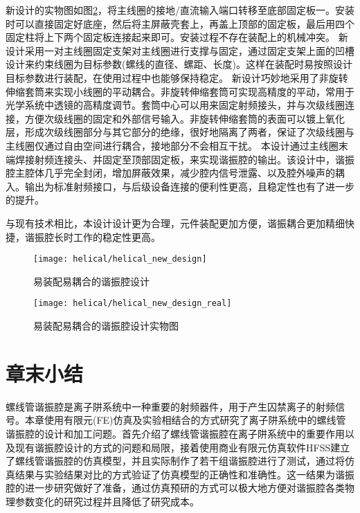 新设计的实物图如图\ref{fig:helical_new_design_real}，将主线圈的接地/直流输入端口转移至底部固定板一。安装时可以直接固定好底座，然后将主屏蔽壳套上，再盖上顶部的固定板，最后用四个固定柱将上下两个固定板连接起来即可。安装过程不存在装配上的机械冲突。
新设计采用一对主线圈固定支架对主线圈进行支撑与固定，通过固定支架上面的凹槽设计来约束线圈为目标参数(螺线的直径、螺距、长度)。这样在装配时易按照设计目标参数进行装配，在使用过程中也能够保持稳定。
新设计巧妙地采用了非旋转伸缩套筒来实现小线圈的平动耦合。非旋转伸缩套筒可实现高精度的平动，常用于光学系统中透镜的高精度调节。套筒中心可以用来固定射频接头，并与次级线圈连接，方便次级线圈的固定和外部信号输入。非旋转伸缩套筒的表面可以镀上氧化层，形成次级线圈部分与其它部分的绝缘，很好地隔离了两者，保证了次级线圈与主线圈仅通过自由空间进行耦合，接地部分不会相互干扰。
本设计通过主线圈末端焊接射频连接头、并固定至顶部固定板，来实现谐振腔的输出。该设计中，谐振腔主腔体几乎完全封闭，增加屏蔽效果，减少腔内信号泄露、以及腔外噪声的耦入。输出为标准射频接口，与后级设备连接的便利性更高，且稳定性也有了进一步的提升。

与现有技术相比，本设计设计更为合理，元件装配更加方便，谐振耦合更加精细快捷，谐振腔长时工作的稳定性更高。
\begin{figure}
    \centering
    \texttt{[image: helical/helical\_new\_design]}
    \caption[易装配易耦合的谐振腔设计]{易装配易耦合的谐振腔设计\label{fig:helical_new_design}}
\end{figure}

\begin{figure}
    \centering
    \texttt{[image: helical/helical\_new\_design\_real]}
    \caption[易装配易耦合的谐振腔设计实物图]{易装配易耦合的谐振腔设计实物图\label{fig:helical_new_design_real}}
\end{figure}







\newpage
\section[章末小结]{章末小结}
螺线管谐振腔是离子阱系统中一种重要的射频器件，用于产生囚禁离子的射频信号。本章使用有限元(FE)仿真及实验相结合的方式研究了离子阱系统中的螺线管谐振腔的设计和加工问题。首先介绍了螺线管谐振腔在离子阱系统中的重要作用以及现有谐振腔设计的方式的问题和局限，接着使用商业有限元仿真软件HFSS建立了螺线管谐振腔的仿真模型，并且实际制作了若干组谐振腔进行了测试，通过将仿真结果与实验结果对比的方式验证了仿真模型的正确性和准确性。这一结果为谐振腔的进一步研究做好了准备，通过仿真预研的方式可以极大地方便对谐振腔各类物理参数变化的研究过程并且降低了研究成本。


